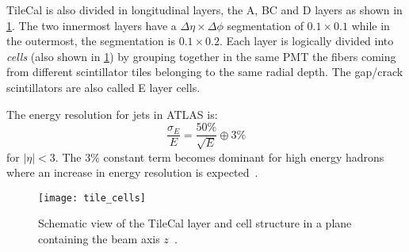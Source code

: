 TileCal is also divided in longitudinal layers, the A, BC and D layers as shown
in \cref{fig:tile_cells}. The two innermost layers have a
$\Delta \eta \times \Delta \phi$ segmentation of $0.1 \times 0.1$ while in the
outermost, the segmentation is $0.1 \times 0.2$. Each layer is logically divided
into \emph{cells} (also shown in \cref{fig:tile_cells}) by grouping together in
the same PMT the fibers coming from different scintillator tiles belonging to
the same radial depth. The gap/crack scintillators are also called E layer
cells.

The energy resolution for jets in ATLAS is:
\begin{equation}
  \label{eq:79}
  \frac{\sigma_E}{E} = \frac{50\%}{\sqrt{E}} \oplus 3\%
\end{equation}
for $|\eta| < 3$. The 3\% constant term becomes dominant for high energy hadrons
where an increase in energy resolution is expected~\cite{TileCal}.

\begin{figure}[!h]
  \centering
    \texttt{[image: tile\_cells]}
    \caption{Schematic view of the TileCal layer and cell structure in a plane
      containing the beam axis $z$~\cite{TileCalPub}.}
    \label{fig:tile_cells}
\end{figure}
